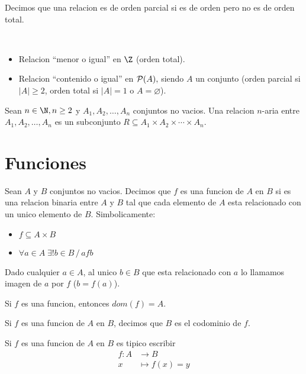 \begin{definition}
	Decimos que una relacion es de orden parcial si es de orden pero no es de orden total.
\end{definition}

\begin{example}
	~\begin{itemize}
		\item Relacion ``menor o igual'' en \(\Z \) (orden total).
		\item Relacion ``contenido o igual'' en \(\mathcal{\MakeUppercase{p}}(A), \) siendo \(A \) un conjunto (orden parcial si \(|A| \geq 2\), orden total si \(|A| = 1 \) o \(A = \varnothing \)).
	\end{itemize}
\end{example}

\begin{definition}
	Sean \(n \in \N, n \geq 2\) y \(A_1, A_2, \ldots, A_n \) conjuntos no vacios. Una relacion \(n \)-aria entre \(A_1, A_2, \ldots, A_n \) es un subconjunto \(R \subseteq A_1 \times A_2 \times \cdots \times A_n \).
\end{definition}

\section{Funciones}

\begin{definition}[Función]
	Sean \(A \) y \(B \) conjuntos no vacios. Decimos que \(f \) es una funcion de \(A \) en \(B \) si es una relacion binaria entre \(A \) y \(B\) tal que cada elemento de \(A \) esta relacionado con un unico elemento de \(B\). Simbolicamente:
	\begin{itemize}
		\item \(f \subseteq A \times B \)
		\item \(\forall a \in A \; \exists! b \in B\, / \, afb \)
	\end{itemize}
	Dado cualquier \(a \in A \), al unico \(b \in B \) que esta relacionado con \(a \) lo llamamos imagen de \(a \) por \(f \) (\(b = f(a)\)).
\end{definition}
\begin{remark}
	Si \(f \) es una funcion, entonces \(dom(f) = A \).
\end{remark}

\begin{definition}[Codominio]
	Si \(f \) es una funcion de \(A \) en \(B \), decimos que \(B \) es el codominio de \(f \).
\end{definition}
Si \(f \) es una funcion de \(A \) en \(B \) es tipico escribir
\[
	\begin{aligned}
		f \colon A & \longrightarrow B  \\
		x          & \mapsto f (x ) = y
	\end{aligned}
\]


